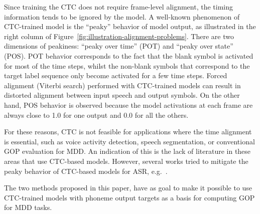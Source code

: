Since training the CTC does not require frame-level alignment, the timing information tends to be ignored by the model.
A well-known phenomenon of CTC-trained model is the ``peaky'' behavior of model output, as illustrated in the right column of Figure~\ref{fig:illustration-alignment-problems}.
There are two dimensions of peakiness: ``peaky over time'' (POT) and ``peaky over state'' (POS).
POT behavior corresponds to the fact that the blank symbol is activated for most of the time steps, whilst the non-blank symbols that correspond to the target label sequence only become activated for a few time steps. 
Forced alignment (Viterbi search) performed with CTC-trained models can result in distorted alignment between input speech and output symbols.
On the other hand, POS behavior is observed because the model activations at each frame are always close to 1.0 for one output and 0.0 for all the others.

For these reasons, CTC is not feasible for applications where the time alignment is essential, such as voice activity detection, speech segmentation, or conventional GOP evaluation for MDD.
An indication of this is the lack of literature in these areas that use CTC-based models.
However, several works tried to mitigate the peaky behavior of CTC-based models for ASR, e.g.~\cite{why_peaky, CTC-ME, huang2024peakyaccuratectcforced}.

The two methods proposed in this paper, have as goal to make it possible to use CTC-trained models with phoneme output targets as a basis for computing GOP for MDD tasks.

